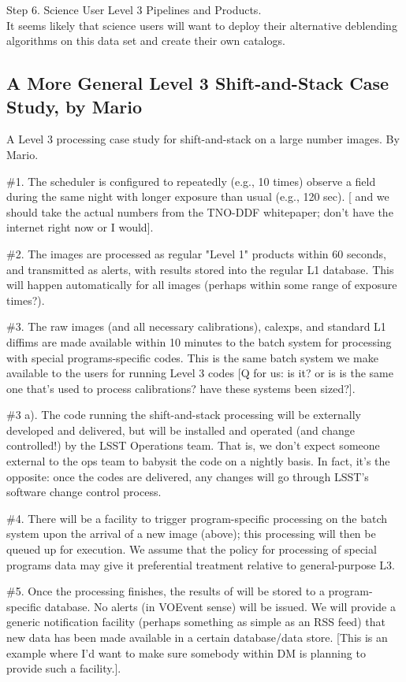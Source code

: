 \documentclass[DM,lsstdraft,toc]{lsstdoc}
\begin{document}
Step 6. Science User Level 3 Pipelines and Products. \\
It seems likely that science users will want to deploy their alternative deblending algorithms on this data set and create their own catalogs. 


\subsection{A More General Level 3 Shift-and-Stack Case Study, by Mario}\label{ssec:SPCS_SAS}

A Level 3 processing case study for shift-and-stack on a large number images. By Mario.

\#1. The scheduler is configured to repeatedly (e.g., 10 times) observe a field during the same night with longer exposure than usual (e.g., 120 sec). [ and we should take the actual numbers from the TNO-DDF whitepaper; don't have the internet right now or I would].

\#2. The images are processed as regular "Level 1" products within 60 seconds, and transmitted as alerts, with results stored into the regular L1 database. This will happen automatically for all images (perhaps within some range of exposure times?).

\#3. The raw images (and all necessary calibrations), calexps, and standard L1 diffims are made available within 10 minutes to the batch system for processing with special programs-specific codes. This is the same batch system we make available to the users for running Level 3 codes [Q for us: is it? or is is the same one that's used to process calibrations? have these systems been sized?]. 

\#3 a). The code running the shift-and-stack processing will be externally developed and delivered, but will be installed and operated (and change controlled!) by the LSST Operations team. That is, we don't expect someone external to the ops team to babysit the code on a nightly basis. In fact, it's the opposite: once the codes are delivered, any changes will go through LSST's software change control process.

\#4. There will be a facility to trigger program-specific processing on the batch system upon the arrival of a new image (above); this processing will then be queued up for execution. We assume that the policy for processing of special programs data may give it preferential treatment relative to general-purpose L3. 

\#5. Once the processing finishes, the results of will be stored to a program-specific database. No alerts (in VOEvent sense) will be issued. We will provide a generic notification facility (perhaps something as simple as an RSS feed) that new data has been made available in a certain database/data store. [This is an example where I'd want to make sure somebody within DM is planning to provide such a facility.].
\end{document}
